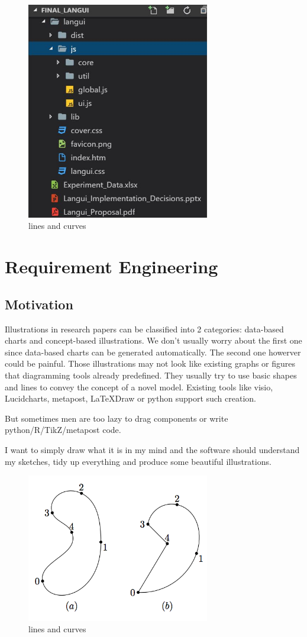 \documentclass[10pt,conference, twocolumn]{IEEEtran}
\begin{document}
\begin{figure}[H]
\caption{lines and curves}
\includegraphics[width=8cm]{w1.JPG}
\end{figure}



\section{Requirement Engineering}

\subsection{Motivation}
Illustrations in research papers can be classified into 2 categories: data-based charts and concept-based illustrations. We don't usually worry about the first one since data-based charts can be generated automatically. The second one howerver could be painful. Those illustrations may not look like existing graphs or figures that diagramming tools already predefined. They usually try to use basic shapes and lines to convey the concept of a novel model. Existing tools like visio, Lucidcharts, metapost, LaTeXDraw or python support such creation.

But sometimes men are too lazy to drag components or write python/R/TikZ/metapost code.

I want to simply draw what it is in my mind and the software should understand my sketches, tidy up everything and produce some beautiful illustrations.

\begin{figure}[H]
\caption{lines and curves}
\includegraphics[width=8cm]{1.png}
\end{figure}
\end{document}
